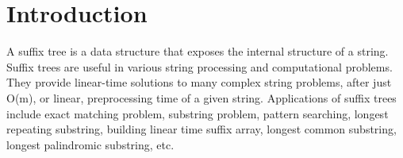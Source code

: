 \documentclass[11pt,a4paper]{article}
\begin{document}

\section{Introduction}
\label{sec:introduction}
A suffix tree is a data structure that exposes the internal structure of a string. Suffix trees are useful in various string processing and computational problems. They provide linear-time solutions to many complex string problems, after just O(m), or linear, preprocessing time of a given string. Applications of suffix trees include exact matching problem, substring problem, pattern searching, longest repeating substring, building linear time suffix array, longest common substring, longest palindromic substring, etc.
\end{document}
